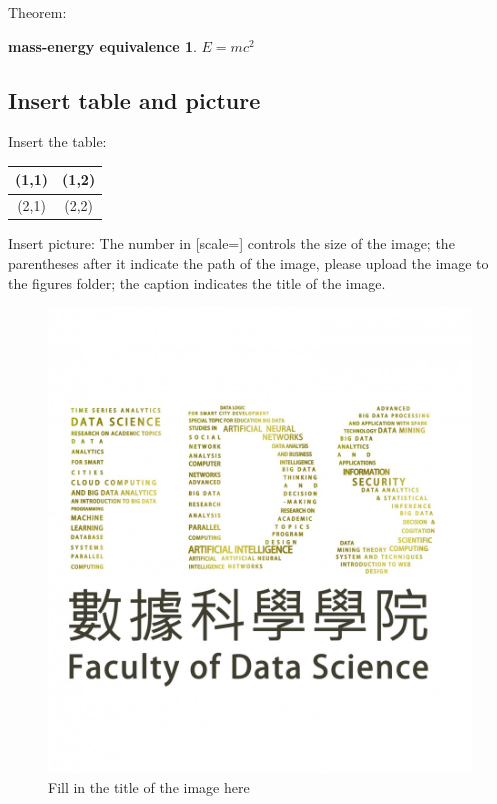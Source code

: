 \documentclass[12pt,hyperref,a4paper,UTF8]{ctexart}
\begin{document}
Theorem:
\newtheorem{mass-energy equivalence}{mass-energy equivalence}[section]
\begin{mass-energy equivalence} \label{thm:1}
$E = mc^2$
\end{mass-energy equivalence}

\subsection{Insert table and picture}
Insert the table:
\begin{table}[h]
    \begin{tabular}{|c|c|}%
        \hline  %
        (1,1) & (1,2) \\
        \hline  %
        (2,1) & (2,2) \\
        \hline %
    \end{tabular}
\end{table}

Insert picture:
The number in [scale=] controls the size of the image; the parentheses after it indicate the path of the image, please upload the image to the figures folder; the caption indicates the title of the image.
\begin{figure}[h]
    \centering
    \includegraphics[scale=0.1]{figures/FDS logo.jpg}
    \caption{Fill in the title of the image here}
\end{figure}
\end{document}
